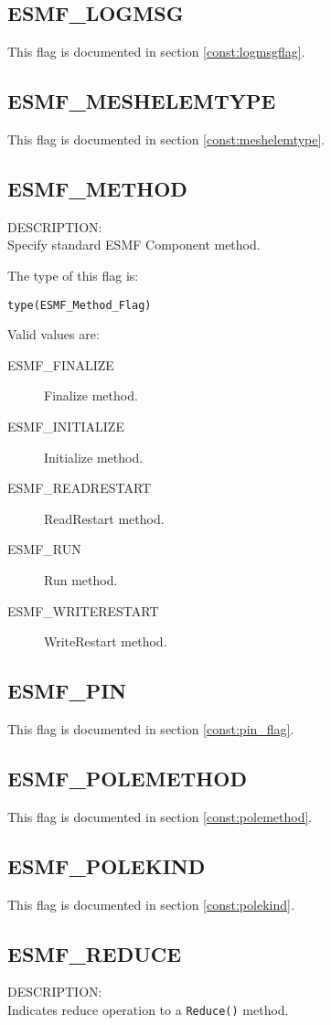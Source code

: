 \subsection{ESMF\_LOGMSG}
This flag is documented in section \ref{const:logmsgflag}.

\subsection{ESMF\_MESHELEMTYPE}
This flag is documented in section \ref{const:meshelemtype}.

\subsection{ESMF\_METHOD}
\label{const:method}

{\sf DESCRIPTION:\\}  
Specify standard ESMF Component method.

The type of this flag is:

{\tt type(ESMF\_Method\_Flag)}

Valid values are:
\begin{description}
\item [ESMF\_FINALIZE]
      Finalize method.
\item [ESMF\_INITIALIZE]
      Initialize method.
\item [ESMF\_READRESTART]
      ReadRestart method.
\item [ESMF\_RUN]
      Run method.
\item [ESMF\_WRITERESTART]
      WriteRestart method.
\end{description}

\subsection{ESMF\_PIN}
This flag is documented in section \ref{const:pin_flag}.

\subsection{ESMF\_POLEMETHOD}
This flag is documented in section \ref{const:polemethod}.

\subsection{ESMF\_POLEKIND}
This flag is documented in section \ref{const:polekind}.

\subsection{ESMF\_REDUCE}
\label{const:reduce}
{\sf DESCRIPTION:\\}
Indicates reduce operation to a {\tt Reduce()} method.


